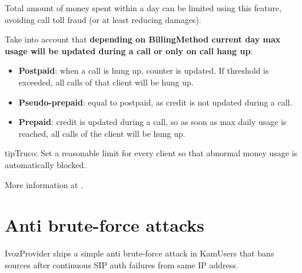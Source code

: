\documentclass[letterpaper,10pt,spanish]{sphinxmanual}
\begin{document}
Total amount of money spent within a day can be limited using this feature, avoiding call toll fraud (or at least
reducing damages).

Take into account that \textbf{depending on BillingMethod current day max usage will be updated during a call or only on call hang up}:
\begin{itemize}
\item {} 
\textbf{Postpaid}: when a call is hung up, counter is updated. If threshold is exceeded, all calls of that client will be hung up.

\item {} 
\textbf{Pseudo-prepaid}: equal to postpaid, as credit is not updated during a call.

\item {} 
\textbf{Prepaid}: credit is updated during a call, so as soon as max daily usage is reached, all calls of the client will be hung up.

\end{itemize}

\begin{notice}{tip}{Truco:}
Set a reasonable limit for every client so that abnormal money usage is automatically blocked.
\end{notice}

More information at {\hyperref[administration_portal/brand/billing/current_day_usages:current\string-day\string-usages]{}}.


\section{Anti brute-force attacks}
\label{security_and_maintenance/security/antibruteforce:anti-brute-force-attacks}\label{security_and_maintenance/security/antibruteforce::doc}
IvozProvider ships a simple anti brute-force attack in KamUsers that bans sources after continuous SIP auth failures
from same IP address.
\end{document}
